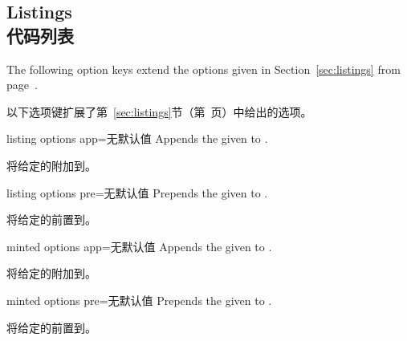 \subsection{Listings\\代码列表}
The following option keys extend the options given in
Section~\ref{sec:listings}
from page~\pageref{sec:listings}.

以下选项键扩展了第~\ref{sec:listings}节（第\pageref{sec:listings}~页）中给出的选项。
\begin{docTcbKey}[][doc new=2019-07-11]{listing options app}{=}{无默认值}
Appends the given  to .

将给定的附加到。
\end{docTcbKey}

\begin{docTcbKey}[][doc new=2019-07-11]{listing options pre}{=}{无默认值}
Prepends the given  to .

将给定的前置到。
\end{docTcbKey}

\begin{docTcbKey}[][doc new=2019-07-11]{minted options app}{=}{无默认值}
Appends the given  to .

将给定的附加到。
\end{docTcbKey}

\begin{docTcbKey}[][doc new=2019-07-11]{minted options pre}{=}{无默认值}
Prepends the given  to .

将给定的前置到。
\end{docTcbKey}


